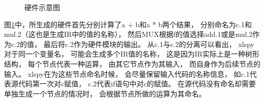 \begin{figure}[h]
\centering

\caption{硬件示意图}
\label{fig.1}
\end{figure}

图\ref{fig.1}中，所生成的硬件首先分别计算了a + b和a * b两个结果，
分别命名为c.1和mul.2（这也是生成IR中的值的名称），
然后MUX根据f的值选择add.1或是mul.2作为c.2的值，
最后将c.2作为硬件模块的输出。
从c.1与c.2的分离可以看出，
xlspy对于同一个变量名，
可能会生成多个IR值的名称，
这是因为IR实际上是一种树形结构，
每个节点代表一种运算，
由其它节点作为其输入，
而自身作为后续节点的输入。
xlspy在为这些节点命名时候，
会尽量保留输入代码的名称信息，
如c.1代表源代码第一次对c赋值，
c.2代表if语句中对c的赋值。
在源代码没有命名却需要单独生成一个节点的情况时，
会根据节点所做的运算为其命名。